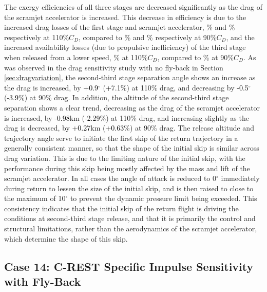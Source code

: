 The exergy efficiencies of all three stages are decreased significantly as the drag of the scramjet accelerator is increased. This decrease in efficiency is due to the increased drag losses of the first stage and scramjet accelerator, \WDoneCdOneHundredTen\% and \WDsecondCdOneHundredTen\% respectively at 110\%$C_D$, compared to \WDoneCdNinety\% and \WDsecondCdNinety\% respectively at 90\%$C_D$, and the increased availability losses (due to propulsive inefficiency) of the third stage when released from a lower speed, \PlossthreeCdOneHundredTen\% at 110\%$C_D$, compared to \PlossthreeCdNinety \% at 90\%$C_D$.
As was observed in the drag sensitivity study with no fly-back in Section \ref{sec:dragvariation}, the second-third stage separation angle shows an increase as the drag is increased, by \textcolor{black}{+0.9}$^\circ$ (\textcolor{black}{+7.1}\%) at 110\% drag, and decreasing by \textcolor{black}{-0.5}$^\circ$ (\textcolor{black}{-3.9}\%) at 90\% drag. In addition, the altitude of the second-third stage separation shows a clear trend, decreasing as the drag of the scramjet accelerator is increased, by \textcolor{black}{-0.98}km (-\textcolor{black}{2.29}\%) at 110\% drag, and increasing slightly as the drag is decreased, by \textcolor{black}{+0.27}km (\textcolor{black}{+0.63}\%) at 90\% drag.  
The release altitude and trajectory angle serve to initiate the first skip of the return trajectory in a generally consistent manner, so that the shape of the initial skip is similar across drag variation. This is due to the limiting nature of the initial skip, with the performance during this skip being mostly affected by the mass and lift of the scramjet accelerator. 
In all cases the angle of attack is reduced to 0$^\circ$ immediately during return to lessen the size of the initial skip, and is then raised to close to the maximum of 10$^\circ$ to prevent the dynamic pressure limit being exceeded. This consistency indicates that the initial skip of the return flight is driving the conditions at second-third stage release, and that it is primarily the control and structural limitations, rather than the aerodynamics of the scramjet accelerator, which determine the shape of this skip.


\subsection{Case 14: C-REST Specific Impulse Sensitivity with Fly-Back}


